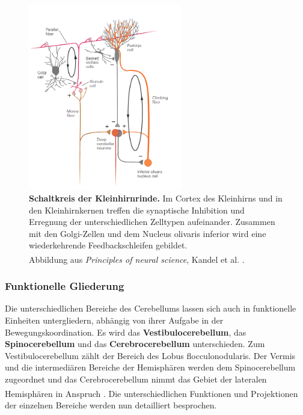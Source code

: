 \begin{figure}[H]
    \centering
    \includegraphics[width=0.6\textwidth]{pictures/Bilder_Laura/circuit-cerebellum.PNG}
    \caption[Schaltkreis der Kleinhirnrinde]{\textbf{Schaltkreis der Kleinhirnrinde.} Im Cortex des Kleinhirns und in den Kleinhirnkernen treffen die synaptische Inhibition und Erregnung der unterschiedlichen Zelltypen aufeinander. Zusammen mit den Golgi-Zellen und dem Nucleus olivaris inferior wird eine wiederkehrende Feedbackschleifen gebildet. \\ Abbildung aus \textit{Principles of neural science}, Kandel et al. \textsuperscript{\cite[Kap.~42]{kandel2013principles}}.}
    \label{fig:schaltkreis_kleinhirn}
\end{figure}

\subsubsection{Funktionelle Gliederung}
Die unterschiedlichen Bereiche des Cerebellums lassen sich auch in funktionelle Einheiten untergliedern, abhängig von ihrer Aufgabe in der Bewegungskoordination. Es wird das \textbf{Vestibulocerebellum}, das \textbf{Spinocerebellum} und das \textbf{Cerebrocerebellum} unterschieden. Zum Vestibulocerebellum zählt der Bereich des Lobus flocculonodularis. Der Vermis und die intermediären Bereiche der Hemisphären werden dem Spinocerebellum zugeordnet und das Cerebrocerebellum nimmt das Gebiet der lateralen Hemisphären in Anspruch \textsuperscript{\cite[Kap.~42]{kandel2013principles}}. Die unterschiedlichen Funktionen und Projektionen der einzelnen Bereiche werden nun detailliert besprochen. 

